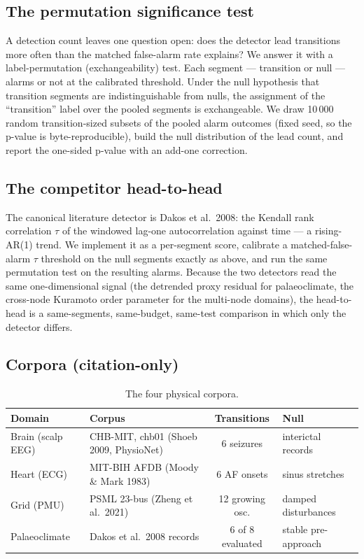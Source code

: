 \documentclass[aip,cha,preprint,amsmath,amssymb]{revtex4-2}
\begin{document}
\subsection{The permutation significance test}

A detection count leaves one question open: does the detector lead
transitions more often than the matched false-alarm rate explains? We
answer it with a label-permutation (exchangeability) test. Each segment
--- transition or null --- alarms or not at the calibrated threshold.
Under the null hypothesis that transition segments are indistinguishable
from nulls, the assignment of the ``transition'' label over the pooled
segments is exchangeable. We draw 10\,000 random transition-sized
subsets of the pooled alarm outcomes (fixed seed, so the p-value is
byte-reproducible), build the null distribution of the lead count, and
report the one-sided p-value with an add-one correction.

\subsection{The competitor head-to-head}

The canonical literature detector is Dakos et al.\ 2008: the Kendall
rank correlation $\tau$ of the windowed lag-one autocorrelation against
time --- a rising-AR(1) trend. We implement it as a per-segment score,
calibrate a matched-false-alarm $\tau$ threshold on the null segments
exactly as above, and run the same permutation test on the resulting
alarms. Because the two detectors read the same one-dimensional signal
(the detrended proxy residual for palaeoclimate, the cross-node
Kuramoto order parameter for the multi-node domains), the head-to-head
is a same-segments, same-budget, same-test comparison in which only the
detector differs.

\subsection{Corpora (citation-only)}

\begin{table}[h!]
\centering
\footnotesize
\setlength{\tabcolsep}{2.5pt}
\begin{tabular}{llcl}
\toprule
Domain & Corpus & Transitions & Null \\
\midrule
Brain (scalp EEG) & CHB-MIT, chb01 (Shoeb 2009, PhysioNet) & 6 seizures & interictal records \\
Heart (ECG) & MIT-BIH AFDB (Moody \& Mark 1983) & 6 AF onsets & sinus stretches \\
Grid (PMU) & PSML 23-bus (Zheng et al.\ 2021) & 12 growing osc. & damped disturbances \\
Palaeoclimate & Dakos et al.\ 2008 records & 6 of 8 evaluated & stable pre-approach \\
\bottomrule
\end{tabular}
\caption{The four physical corpora.}
\end{table}
\end{document}
